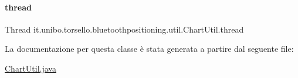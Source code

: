 \hypertarget{classit_1_1unibo_1_1torsello_1_1bluetoothpositioning_1_1util_1_1ChartUtil_ac73af861c9ca49e226fe1218cef6c572_ac73af861c9ca49e226fe1218cef6c572}{}\label{classit_1_1unibo_1_1torsello_1_1bluetoothpositioning_1_1util_1_1ChartUtil_ac73af861c9ca49e226fe1218cef6c572_ac73af861c9ca49e226fe1218cef6c572} 
\paragraph{\texorpdfstring{thread}{thread}}
{\footnotesize\ttfamily Thread it.\+unibo.\+torsello.\+bluetoothpositioning.\+util.\+Chart\+Util.\+thread\hspace{0.3cm}{\ttfamily [private]}}



La documentazione per questa classe è stata generata a partire dal seguente file\+:\begin{DoxyCompactItemize}
\item 
\hyperlink{ChartUtil_8java}{Chart\+Util.\+java}\end{DoxyCompactItemize}

